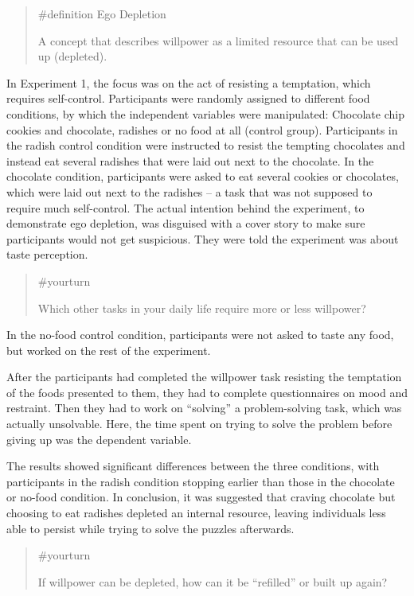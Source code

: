 \documentclass[
  letterpaper,
]{book}
\begin{document}
\begin{quote}
\label{def-egodepletion}{\#definition} Ego Depletion

A concept that describes willpower as a limited resource that can be
used up (depleted).
\end{quote}

In Experiment 1, the focus was on the act of resisting a temptation,
which requires self-control. Participants were randomly assigned to
different food conditions, by which the independent variables were
manipulated: Chocolate chip cookies and chocolate, radishes or no food
at all (control group). Participants in the radish control condition
were instructed to resist the tempting chocolates and instead eat
several radishes that were laid out next to the chocolate. In the
chocolate condition, participants were asked to eat several cookies or
chocolates, which were laid out next to the radishes -- a task that was
not supposed to require much self-control. The actual intention behind
the experiment, to demonstrate ego depletion, was disguised with a cover
story to make sure participants would not get suspicious. They were told
the experiment was about taste perception.

\begin{quote}
{\#yourturn}

Which other tasks in your daily life require more or less willpower?
\end{quote}

In the no-food control condition, participants were not asked to taste
any food, but worked on the rest of the experiment.

After the participants had completed the willpower task resisting the
temptation of the foods presented to them, they had to complete
questionnaires on mood and restraint. Then they had to work on
``solving'' a problem-solving task, which was actually unsolvable. Here,
the time spent on trying to solve the problem before giving up was the
dependent variable.

The results showed significant differences between the three conditions,
with participants in the radish condition stopping earlier than those in
the chocolate or no-food condition. In conclusion, it was suggested that
craving chocolate but choosing to eat radishes depleted an internal
resource, leaving individuals less able to persist while trying to solve
the puzzles afterwards.

\begin{quote}
{\#yourturn}

If willpower can be depleted, how can it be ``refilled'' or built up
again?
\end{quote}
\end{document}

